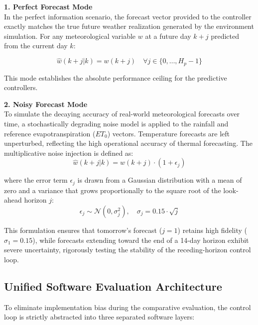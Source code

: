 \documentclass[11pt, a4paper]{article}
\begin{document}
\textbf{1. Perfect Forecast Mode} \\
In the perfect information scenario, the forecast vector provided to the controller exactly matches the true future weather realization generated by the environment simulation. For any meteorological variable $w$ at a future day $k+j$ predicted from the current day $k$:

\begin{equation}
    \hat{w}(k+j|k) = w(k+j) \quad \forall j \in \{0, \dots, H_p-1\}
\end{equation}

This mode establishes the absolute performance ceiling for the predictive controllers.

\textbf{2. Noisy Forecast Mode} \\
To simulate the decaying accuracy of real-world meteorological forecasts over time, a stochastically degrading noise model is applied to the rainfall and reference evapotranspiration ($ET_0$) vectors. Temperature forecasts are left unperturbed, reflecting the high operational accuracy of thermal forecasting. The multiplicative noise injection is defined as:
\begin{equation}
    \hat{w}(k+j|k) = w(k+j) \cdot (1 + \epsilon_j)
\end{equation}

where the error term $\epsilon_j$ is drawn from a Gaussian distribution with a mean of zero and a variance that grows proportionally to the square root of the look-ahead horizon $j$:
\begin{equation}
    \epsilon_j \sim \mathcal{N}(0, \sigma_j^2), \quad \sigma_j = 0.15 \cdot \sqrt{j}
\end{equation}

This formulation ensures that tomorrow's forecast ($j=1$) retains high fidelity ($\sigma_1 = 0.15$), while forecasts extending toward the end of a 14-day horizon exhibit severe uncertainty, rigorously testing the stability of the receding-horizon control loop.

\subsection{Unified Software Evaluation Architecture}
To eliminate implementation bias during the comparative evaluation, the control loop is strictly abstracted into three separated software layers:
\end{document}

